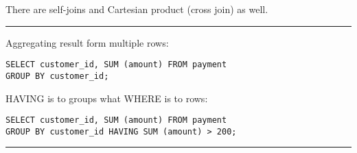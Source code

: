 \documentclass{charun}
\begin{document}
\begin{multicols*}{2}
There are self-joins and Cartesian product (cross join) as well.

\hrule

Aggregating result form multiple rows:
\begin{verbatim}
SELECT customer_id, SUM (amount) FROM payment
GROUP BY customer_id;
\end{verbatim}

HAVING is to groups what WHERE is to rows:
\begin{verbatim}
SELECT customer_id, SUM (amount) FROM payment
GROUP BY customer_id HAVING SUM (amount) > 200;
\end{verbatim}

\hrule

\end{multicols*}
\end{document}
